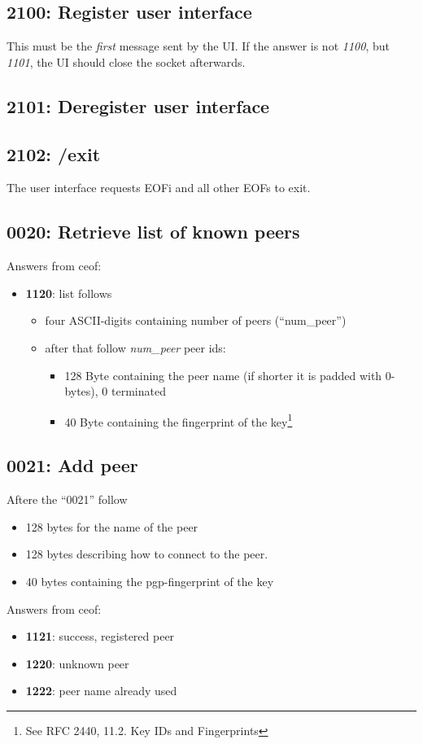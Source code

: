 \documentclass[12pt,a4paper]{book}
\begin{document}
\subsection{2100: Register user interface}
This must be the \emph{first} message sent by the UI. If the answer is not
\emph{1100}, but \emph{1101}, the UI should close the socket afterwards.
\subsection{2101: Deregister user interface}
\subsection{2102: /exit}
The user interface requests EOFi and all other EOFs to exit.
\subsection{0020: Retrieve list of known peers}
Answers from ceof:
\begin{itemize}
\item \textbf{1120}: list follows
\begin{itemize}
\item four ASCII-digits containing number of peers ("`num\_peer"')
\item after that follow \textit{num\_peer} peer ids:
\begin{itemize}
\item 128 Byte containing the peer name (if shorter it is padded with 0-bytes), 0 terminated
\item 40 Byte containing the fingerprint of the
key\footnote{See RFC 2440, 11.2. Key IDs and Fingerprints}
\end{itemize}
\end{itemize}
\end{itemize}
\subsection{0021: Add peer}
Aftere the "`0021"' follow

\begin{itemize}
\item 128 bytes for the name of the peer
\item 128 bytes describing how to connect to the peer.
\item 40 bytes  containing the pgp-fingerprint of the key
\end{itemize}
Answers from ceof:
\begin{itemize}
\item \textbf{1121}: success, registered peer
\item \textbf{1220}: unknown peer
\item \textbf{1222}: peer name already used
\end{itemize}
\end{document}
